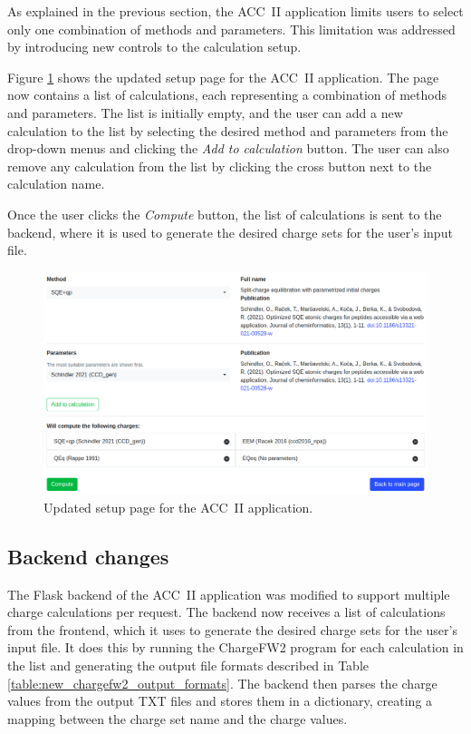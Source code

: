\documentclass[
  digital,     %
  oneside,     %
  nosansbold,  %
  nocolorbold, %
  lof,         %
  lot,         %
]{fithesis4}
\begin{document}
As explained in the previous section, the ACC~II application limits users to select only one combination of methods and parameters. This limitation was addressed by introducing new controls to the calculation setup.

Figure \ref{fig:new_setup} shows the updated setup page for the ACC~II application. The page now contains a list of calculations, each representing a combination of methods and parameters. The list is initially empty, and the user can add a new calculation to the list by selecting the desired method and parameters from the drop-down menus and clicking the \textit{Add to calculation} button. The user can also remove any calculation from the list by clicking the cross button next to the calculation name.

Once the user clicks the \textit{Compute} button, the list of calculations is sent to the backend, where it is used to generate the desired charge sets for the user's input file.

\begin{figure}[htbp]
  \begin{center}
    \includegraphics[width=\textwidth]{figures/new_setup.png}
  \end{center}
  \caption{Updated setup page for the ACC~II application.}
  \label{fig:new_setup}
\end{figure}

\subsection{Backend changes}

The Flask backend of the ACC~II application was modified to support multiple charge calculations per request. The backend now receives a list of calculations from the frontend, which it uses to generate the desired charge sets for the user's input file. It does this by running the ChargeFW2 program for each calculation in the list and generating the output file formats described in Table \ref{table:new_chargefw2_output_formats}. The backend then parses the charge values from the output TXT files and stores them in a dictionary, creating a mapping between the charge set name and the charge values.
\end{document}
